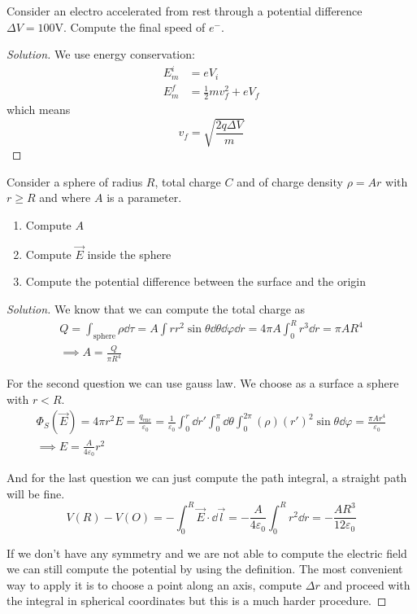 \documentclass[12pt]{extarticle}
\begin{document}
\begin{example}{}{}
	Consider an electro accelerated from rest through a potential difference $\Delta V = 100 \si{\volt}$.
	Compute the final speed of $e^-$.
\end{example}

\begin{proof}[Solution]
	We use energy conservation:
	\begin{align}
		E_m^i & = e V_i                     \\
		E^f_m & = \frac{1}{2}mv_f^2 + e V_f
	\end{align}
	which means
	\begin{equation}
		v_f = \sqrt{\frac{2q \Delta V}{m}}
	\end{equation}
\end{proof}

\begin{example}{}{}
	Consider a sphere of radius $R$, total charge $C$ and of charge density $\rho = Ar$ with $r \geq R$ and where $A$ is a parameter.
	\begin{enumerate}
		\item Compute $A$
		\item Compute $\vec E$ inside the sphere
		\item Compute the potential difference between the surface and the origin
	\end{enumerate}
\end{example}

\begin{proof}[Solution]
	We know that we can compute the total charge as
	\begin{gather}
		Q = \int_\text{sphere} \rho \dd{\tau} = A \int r r^2 \sin \theta \dd{\theta} \dd{\varphi} \dd{r} = 4 \pi A \int_0^R r^3 \dd{r} = \pi A R^4 \\
		\implies A = \frac{Q}{\pi R^4}
	\end{gather}

	For the second question we can use gauss law. We choose as a surface a sphere with $r < R$.
	\begin{gather}
		\Phi_S (\vec E) = 4 \pi r^2 E = \frac{q_\text{enc}}{\varepsilon_0} = \frac{1}{\varepsilon_0} \int_0^r \dd{r'} \int_0^\pi \dd{\theta} \int_0^{2 \pi} (\rho)(r')^2 \sin \theta \dd{\varphi}  = \frac{\pi A r^4}{\varepsilon_0} \\
		\implies E = \frac{A}{4 \varepsilon_0} r^2
	\end{gather}

	And for the last question we can just compute the path integral, a straight path will be fine.
	\begin{equation}
		V(R) - V(O) = - \int^R_0 \vec E \cdot \dd{\vec l} = - \frac{A}{4 \varepsilon_0} \int^R_0 r^2 \dd{r} = - \frac{AR^3}{12 \varepsilon_0}
	\end{equation}

	If we don't have any symmetry and we are not able to compute the electric field we can still compute the potential by using the definition.
	The most convenient way to apply it is to choose a point along an axis, compute $\Delta r$ and proceed with the integral in spherical coordinates but this is a much harder procedure.
\end{proof}
\end{document}
